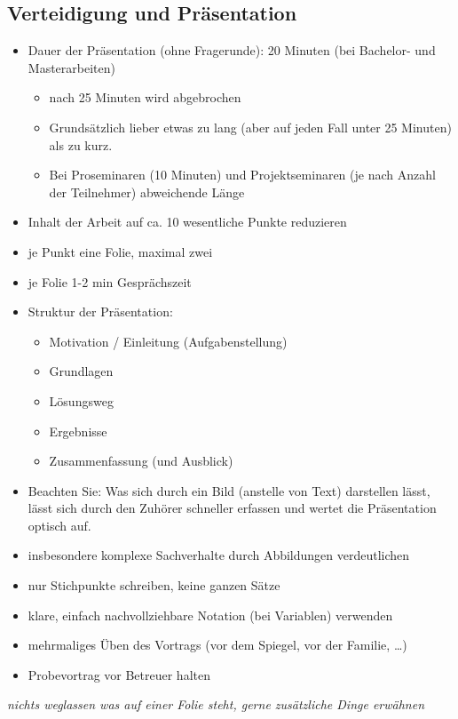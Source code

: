 \subsection*{Verteidigung und Präsentation}
\label{sec:Verteidigung}
\begin{itemize}
  \item Dauer der Präsentation (ohne Fragerunde): 20 Minuten (bei Bachelor- und Masterarbeiten)
    \begin{itemize}
      \item nach 25 Minuten wird abgebrochen
      \item Grundsätzlich lieber etwas zu lang (aber auf jeden Fall unter 25 Minuten) als zu kurz.
      \item Bei Proseminaren (10 Minuten) und Projektseminaren (je nach Anzahl der Teilnehmer) abweichende Länge
    \end{itemize}
  \item Inhalt der Arbeit auf ca. 10 wesentliche Punkte reduzieren
  \item je Punkt eine Folie, maximal zwei
  \item je Folie 1-2 min Gesprächszeit
  \item Struktur der Präsentation:
  \begin{itemize}
    \item Motivation / Einleitung (Aufgabenstellung)
    \item Grundlagen
    \item Lösungsweg
    \item Ergebnisse
    \item Zusammenfassung (und Ausblick)
  \end{itemize}
  \item Beachten Sie: Was sich durch ein Bild (anstelle von Text) darstellen lässt, lässt sich durch den Zuhörer schneller erfassen und wertet die Präsentation optisch auf.
  \item insbesondere komplexe Sachverhalte durch Abbildungen verdeutlichen
  \item nur Stichpunkte schreiben, keine ganzen Sätze
  \item klare, einfach nachvollziehbare Notation (\zB bei Variablen) verwenden
  \item mehrmaliges Üben des Vortrags (\zB vor dem Spiegel, vor der Familie, \ldots)
  \item Probevortrag vor Betreuer halten
\end{itemize}
\emph{nichts weglassen was auf einer Folie steht, gerne zusätzliche Dinge erwähnen}


